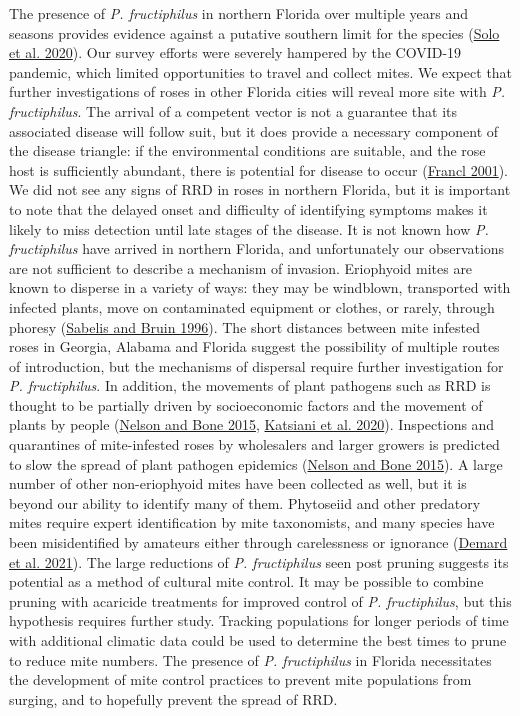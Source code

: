\documentclass[12pt,final,CPage]{ufthesis}
\begin{document}
{  The presence of \emph{P. fructiphilus} in northern Florida over multiple years and seasons provides evidence against a putative southern limit for the species (\protect\hyperlink{ref-Solo2020}{Solo et al. 2020}). Our survey efforts were severely hampered by the COVID-19 pandemic, which limited opportunities to travel and collect mites. We expect that further investigations of roses in other Florida cities will reveal more site with \emph{P. fructiphilus}. The arrival of a competent vector is not a guarantee that its associated disease will follow suit, but it does provide a necessary component of the disease triangle: if the environmental conditions are suitable, and the rose host is sufficiently abundant, there is potential for disease to occur (\protect\hyperlink{ref-Francl2001}{Francl 2001}). We did not see any signs of RRD in roses in northern Florida, but it is important to note that the delayed onset and difficulty of identifying symptoms makes it likely to miss detection until late stages of the disease. It is not known how \emph{P. fructiphilus} have arrived in northern Florida, and unfortunately our observations are not sufficient to describe a mechanism of invasion. Eriophyoid mites are known to disperse in a variety of ways: they may be windblown, transported with infected plants, move on contaminated equipment or clothes, or rarely, through phoresy (\protect\hyperlink{ref-Sabelis1996}{Sabelis and Bruin 1996}). The short distances between mite infested roses in Georgia, Alabama and Florida suggest the possibility of multiple routes of introduction, but the mechanisms of dispersal require further investigation for \emph{P. fructiphilus}. In addition, the movements of plant pathogens such as RRD is thought to be partially driven by socioeconomic factors and the movement of plants by people (\protect\hyperlink{ref-Nelson2015}{Nelson and Bone 2015}, \protect\hyperlink{ref-Katsiani2020}{Katsiani et al. 2020}). Inspections and quarantines of mite-infested roses by wholesalers and larger growers is predicted to slow the spread of plant pathogen epidemics (\protect\hyperlink{ref-Nelson2015}{Nelson and Bone 2015}). A large number of other non-eriophyoid mites have been collected as well, but it is beyond our ability to identify many of them. Phytoseiid and other predatory mites require expert identification by mite taxonomists, and many species have been misidentified by amateurs either through carelessness or ignorance (\protect\hyperlink{ref-Demard2021}{Demard et al. 2021}). The large reductions of \emph{P. fructiphilus} seen post pruning suggests its potential as a method of cultural mite control. It may be possible to combine pruning with acaricide treatments for improved control of \emph{P. fructiphilus}, but this hypothesis requires further study. Tracking populations for longer periods of time with additional climatic data could be used to determine the best times to prune to reduce mite numbers. The presence of \emph{P. fructiphilus} in Florida necessitates the development of mite control practices to prevent mite populations from surging, and to hopefully prevent the spread of RRD.

}
\end{document}
